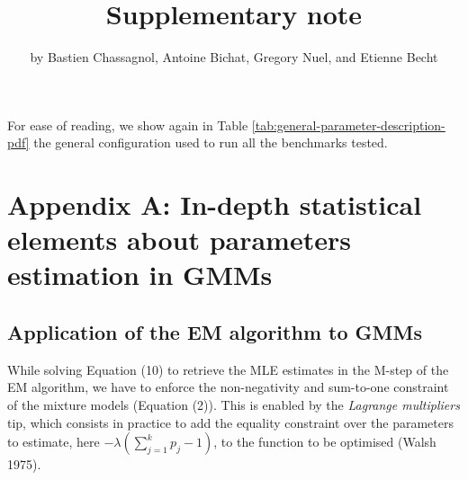 \title{Supplementary note}
\author{by Bastien Chassagnol, Antoine Bichat, Gregory Nuel, and Etienne Becht}

\maketitle


For ease of reading, we show again in Table \ref{tab:general-parameter-description-pdf} the general configuration used to run all the benchmarks tested.

\begin{table}[!h]

\caption{\label{tab:general-parameter-description-pdf}Global options shared by all the benchmarked packages.}
\centering
{}
\end{table}

\appendix

\hypertarget{appendix-a-in-depth-statistical-elements-about-parameters-estimation-in-gmms}{%
\section{Appendix A: In-depth statistical elements about parameters estimation in GMMs}\label{appendix-a-in-depth-statistical-elements-about-parameters-estimation-in-gmms}}

\hypertarget{application-of-the-em-algorithm-to-gmms}{%
\subsection{Application of the EM algorithm to GMMs}\label{application-of-the-em-algorithm-to-gmms}}

While solving Equation (10) to retrieve the MLE estimates in the M-step of the EM algorithm, we have to enforce the non-negativity and sum-to-one constraint of the mixture models (Equation (2)). This is enabled by the \emph{Lagrange multipliers} tip, which consists in practice to add the equality constraint over the parameters to estimate, here \(-\lambda (\sum_{j=1}^k p_j -1)\), to the function to be optimised (Walsh 1975).

